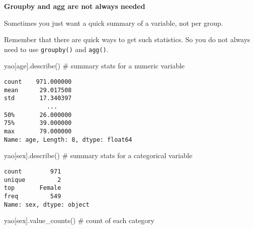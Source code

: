 \documentclass[
  letterpaper,
  DIV=11,
  numbers=noendperiod]{scrreprt}
\newenvironment{Shaded}{\begin{snugshade}}{\end{snugshade}}
\newcommand{\CommentTok}[1]{\textcolor[rgb]{0.37,0.37,0.37}{#1}}
\newcommand{\NormalTok}[1]{\textcolor[rgb]{0.00,0.23,0.31}{#1}}
\newcommand{\StringTok}[1]{\textcolor[rgb]{0.13,0.47,0.30}{#1}}
\begin{document}
\begin{tcolorbox}[enhanced jigsaw, colframe=quarto-callout-note-color-frame, opacityback=0, titlerule=0mm, bottomrule=.15mm, breakable, leftrule=.75mm, colbacktitle=quarto-callout-note-color!10!white, title=\textcolor{quarto-callout-note-color}{\faInfo}\hspace{0.5em}{Pro-tip}, rightrule=.15mm, coltitle=black, opacitybacktitle=0.6, colback=white, left=2mm, arc=.35mm, toptitle=1mm, bottomtitle=1mm, toprule=.15mm]

\textbf{Groupby and agg are not always needed}

Sometimes you just want a quick summary of a variable, not per group.

Remember that there are quick ways to get such statistics. So you do not
always need to use \texttt{groupby()} and \texttt{agg()}.

\begin{Shaded}
\begin{Highlighting}[]
\NormalTok{yao[}\StringTok{\textquotesingle{}age\textquotesingle{}}\NormalTok{].describe() }\CommentTok{\# summary stats for a numeric variable}
\end{Highlighting}
\end{Shaded}

\begin{verbatim}
count    971.000000
mean      29.017508
std       17.340397
            ...    
50%       26.000000
75%       39.000000
max       79.000000
Name: age, Length: 8, dtype: float64
\end{verbatim}

\begin{Shaded}
\begin{Highlighting}[]
\NormalTok{yao[}\StringTok{\textquotesingle{}sex\textquotesingle{}}\NormalTok{].describe() }\CommentTok{\# summary stats for a categorical variable}
\end{Highlighting}
\end{Shaded}

\begin{verbatim}
count        971
unique         2
top       Female
freq         549
Name: sex, dtype: object
\end{verbatim}

\begin{Shaded}
\begin{Highlighting}[]
\NormalTok{yao[}\StringTok{\textquotesingle{}sex\textquotesingle{}}\NormalTok{].value\_counts() }\CommentTok{\# count of each category}
\end{Highlighting}
\end{Shaded}


\end{tcolorbox}
\end{document}
